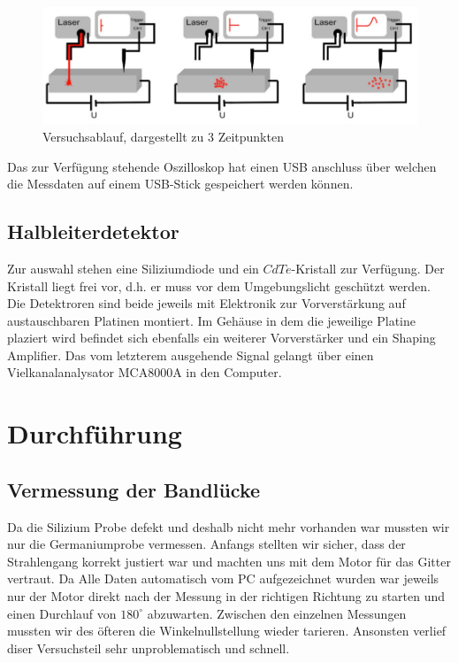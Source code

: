 \documentclass[12pt]{article}
\begin{document}
\begin{figure}[H]
\centering
\includegraphics[width=0.9\linewidth]{pictures/haynesAufbau.eps}
\caption{Versuchsablauf, dargestellt zu 3 Zeitpunkten}
\end{figure}

Das zur Verfügung stehende Oszilloskop hat einen USB anschluss über welchen die Messdaten auf einem USB-Stick gespeichert werden können.

\subsection{Halbleiterdetektor}
Zur auswahl stehen eine Siliziumdiode und ein $CdTe$-Kristall zur Verfügung. Der Kristall liegt frei vor, d.h. er muss vor dem Umgebungslicht geschützt werden. Die Detektroren sind beide jeweils mit Elektronik zur Vorverstärkung auf austauschbaren Platinen montiert. Im Gehäuse in dem die jeweilige Platine plaziert wird befindet sich ebenfalls ein weiterer Vorverstärker und ein Shaping Amplifier. Das vom letzterem ausgehende Signal gelangt über einen Vielkanalanalysator MCA8000A in den Computer.

\section{Durchführung}
\subsection{Vermessung der Bandlücke}
Da die Silizium Probe defekt und deshalb nicht mehr vorhanden war mussten wir nur die Germaniumprobe vermessen.
Anfangs stellten wir sicher, dass der Strahlengang korrekt justiert war und machten uns mit dem Motor für das Gitter vertraut.
Da Alle Daten automatisch vom PC aufgezeichnet wurden war jeweils nur der Motor direkt nach der Messung in der richtigen Richtung zu starten und einen Durchlauf von $180^\circ$ abzuwarten. Zwischen den einzelnen Messungen mussten wir des öfteren die Winkelnullstellung wieder tarieren. Ansonsten verlief diser Versuchsteil sehr unproblematisch und schnell.\\
\end{document}
